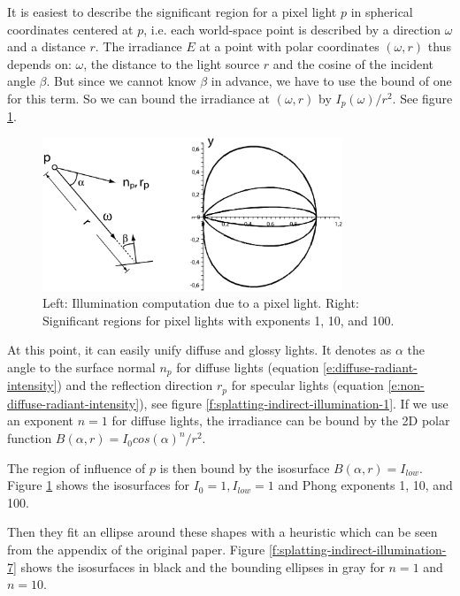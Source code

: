 It is easiest to describe the significant region for a pixel light $p$ in spherical coordinates centered at $p$, i.e. each world-space point is described by a direction $\omega$ and a distance $r$. The irradiance $E$ at a point with polar coordinates $(\omega, r)$ thus depends on: $\omega$, the distance to the light source $r$ and the cosine of the incident angle $\beta$. But since we cannot know $\beta$ in advance, we have to use the bound of one for this term. So we can bound the irradiance at $(\omega,r)$ by $I_p(\omega)/r^{2}$. See figure \ref{f:splatting-indirect-illumination-6}.

\begin{figure}\label{f:splatting-indirect-illumination-6}
	\begin{center}
		\includegraphics[width=0.8\textwidth]{graphics/ir/ir-3-6}
	\end{center}
	\caption{Left: Illumination computation due to a pixel light. Right: Significant regions for pixel lights with exponents 1, 10, and 100.}
\end{figure}

At this point, it can easily unify diffuse and glossy lights. It denotes as $\alpha$ the angle to the surface normal $n_p$ for diffuse lights (equation \ref{e:diffuse-radiant-intensity}) and the reflection direction $r_p$ for specular lights (equation \ref{e:non-diffuse-radiant-intensity}), see figure \ref{f:splatting-indirect-illumination-1}. If we use an exponent $n = 1$ for diffuse lights, the irradiance can be bound by the 2D polar function $B(\alpha,r) = I_0 cos(\alpha)^{n}/r^{2}$.

The region of influence of $p$ is then bound by the isosurface $B(\alpha,r) = I_{low}$. Figure \ref{f:splatting-indirect-illumination-6} shows the isosurfaces for $I_0 = 1, I_{low} = 1$ and Phong exponents 1, 10, and 100.

Then they fit an ellipse around these shapes with a heuristic which can be seen from the appendix of the original paper. Figure \ref{f:splatting-indirect-illumination-7} shows the isosurfaces in black and the bounding ellipses in gray for $n=1$ and $n=10$.

